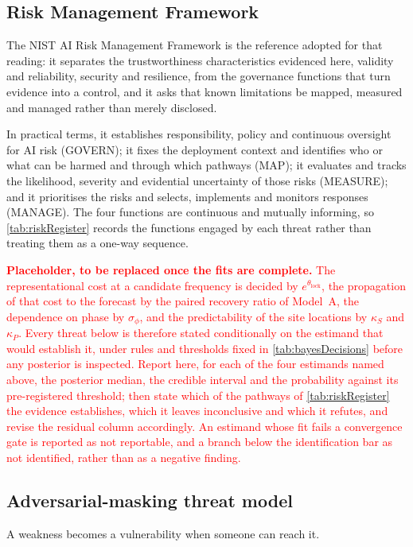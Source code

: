\subsection{Risk Management Framework}
The NIST AI Risk Management Framework\autocite{tabassiArtificialIntelligenceRisk2023} is the reference adopted for that reading: it separates the trustworthiness characteristics evidenced here, validity and reliability, security and resilience, from the governance functions that turn evidence into a control, and it asks that known limitations be mapped, measured and managed rather than merely disclosed.

In practical terms, it establishes responsibility, policy and continuous oversight for AI risk (GOVERN); it fixes the deployment context and identifies who or what can be harmed and through which pathways (MAP); it evaluates and tracks the likelihood, severity and evidential uncertainty of those risks (MEASURE); and it prioritises the risks and selects, implements and monitors responses (MANAGE). The four functions are continuous and mutually informing, so \autoref{tab:riskRegister} records the functions engaged by each threat rather than treating them as a one-way sequence.

\textcolor{red}{\textbf{Placeholder, to be replaced once the fits are complete.} The representational cost at a candidate frequency is decided by $e^{\theta_{\mathrm{lock}}}$, the propagation of that cost to the forecast by the paired recovery ratio of Model~A, the dependence on phase by $\sigma_\phi$, and the predictability of the site locations by $\kappa_S$ and $\kappa_P$. Every threat below is therefore stated conditionally on the estimand that would establish it, under rules and thresholds fixed in \autoref{tab:bayesDecisions} before any posterior is inspected. Report here, for each of the four estimands named above, the posterior median, the credible interval and the probability against its pre-registered threshold; then state which of the pathways of \autoref{tab:riskRegister} the evidence establishes, which it leaves inconclusive and which it refutes, and revise the residual column accordingly. An estimand whose fit fails a convergence gate is reported as not reportable, and a branch below the identification bar as not identified, rather than as a negative finding.}



\subsection{Adversarial-masking threat model}
A weakness becomes a vulnerability when someone can reach it.

